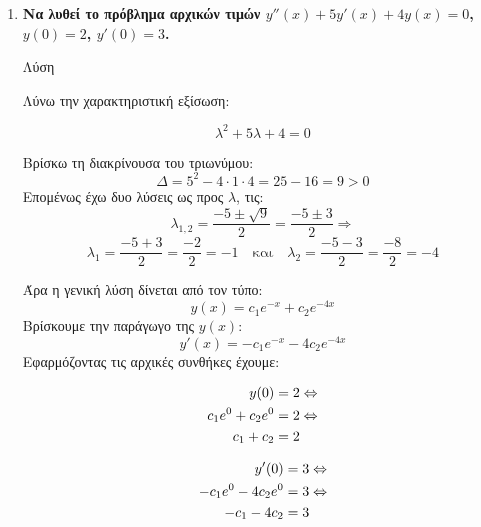 \begin{enumerate}
    \item {\bfseries Να λυθεί το πρόβλημα αρχικών τιμών \boldmath $  y''(x) + 5y'(x) +4y(x)=0
        $, \boldmath $ y(0)=2 $, \boldmath $ y'(0)=3 $.}

        \begin{description}
            \item[Λύση] 
        \end{description}

                Λύνω την χαρακτηριστική εξίσωση:

                \[
                    \lambda ^{2} +5 \lambda + 4 = 0 
                \] 

                Βρίσκω τη διακρίνουσα του τριωνύμου:
                \[
                    \Delta = 5^{2}-4 \cdot 1 \cdot 4 = 25 - 16 = 9 > 0
                \] 
                Επομένως έχω δυο λύσεις ως προς $\lambda$, τις: 
                \[
                    \lambda _{1,2} = \frac{-5 \pm \sqrt{9}}{2} = \frac{-5 \pm 3}{2} \Rightarrow  
               \]
               \[
                   \lambda _{1} = \frac{-5+3}{2} = \frac{-2}{2} = -1 \quad \text{και} \quad
                   \lambda _{2} = \frac{-5-3}{2} = \frac{-8}{2} = -4   
               \] 
               
Άρα η γενική λύση δίνεται από τον τύπο:
\[
    y(x)= c_{1}e^{-x}+ c_{2}e^{-4x} 
\] 
Βρίσκουμε την παράγωγο της $ y(x) $:
\[
    y'(x) = -c_{1}e^{-x}-4 c_{2}e^{-4x} 
\]
Εφαρμόζοντας τις αρχικές συνθήκες έχουμε:

\begin{minipage}{0.4\textwidth}
\begin{align}
    y(0)&=2 \notag \Leftrightarrow  \\ 
    c_{1}e^{0}+ c_{2}e^{0} &= 2 \notag \Leftrightarrow \\ 
    c_{1} + c_{2} &= 2 \label{eq:1} 
\end{align} 
\end{minipage} 
\hspace{\baselineskip} 
\begin{minipage}{0.4\textwidth}
\begin{align}
    y'(0)&=3 \notag \Leftrightarrow \\
    -c_{1}e^{0}-4 c_{2}e^{0} &= 3 \notag \Leftrightarrow \\
    -c_{1} - 4 c_{2} &= 3 \label{eq:2}
\end{align}
\end{minipage}


\end{enumerate}
